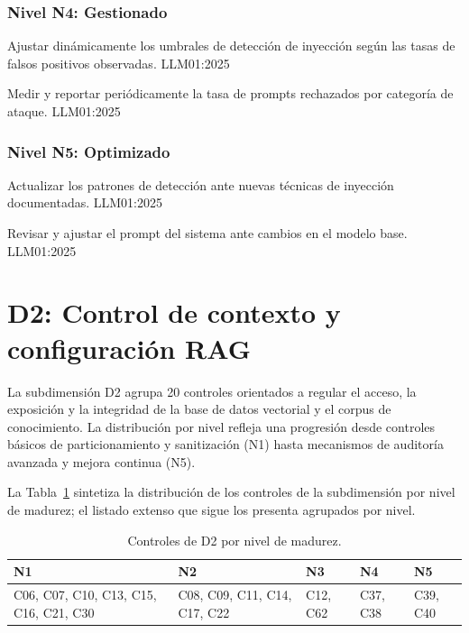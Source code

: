 \subsubsection*{Nivel N4: Gestionado}

  {Ajustar dinámicamente los umbrales de detección de inyección según las tasas de falsos positivos observadas.}
  {LLM01:2025}

  {Medir y reportar periódicamente la tasa de prompts rechazados por categoría de ataque.}
  {LLM01:2025}

\subsubsection*{Nivel N5: Optimizado}

  {Actualizar los patrones de detección ante nuevas técnicas de inyección documentadas.}
  {LLM01:2025}

  {Revisar y ajustar el prompt del sistema ante cambios en el modelo base.}
  {LLM01:2025}

\section{D2: Control de contexto y configuración RAG}
\label{sec:controles-d2}

La subdimensión D2 agrupa 20 controles orientados a regular el acceso, la exposición y la integridad de la base de datos vectorial y el corpus de conocimiento. La distribución por nivel refleja una progresión desde controles básicos de particionamiento y sanitización (N1) hasta mecanismos de auditoría avanzada y mejora continua (N5).

La Tabla~\ref{tab:niveles-d2} sintetiza la distribución de los controles de la subdimensión por nivel de madurez; el listado extenso que sigue los presenta agrupados por nivel.

\begin{table}[H]
  \centering
  \caption{Controles de D2 por nivel de madurez.}
  \label{tab:niveles-d2}
  \begin{tabularx}{\textwidth}{@{} >{\raggedright\arraybackslash}X >{\raggedright\arraybackslash}X >{\raggedright\arraybackslash}X >{\raggedright\arraybackslash}X >{\raggedright\arraybackslash}X @{}}
    \toprule
    \cellcolor{level-n1!15}\textbf{N1} & \cellcolor{level-n2!15}\textbf{N2} & \cellcolor{level-n3!15}\textbf{N3} & \cellcolor{level-n4!15}\textbf{N4} & \cellcolor{level-n5!15}\textbf{N5} \\
    \midrule
    C06, C07, C10, C13, C15, C16, C21, C30 & C08, C09, C11, C14, C17, C22 & C12, C62 & C37, C38 & C39, C40 \\
    \bottomrule
  \end{tabularx}
\end{table}

